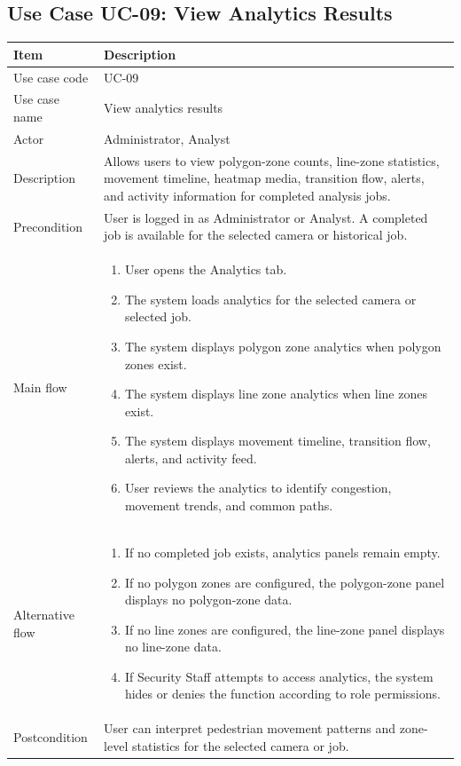 \documentclass[12pt,a4paper]{report}
\begin{document}
\subsection{Use Case UC-09: View Analytics Results}
\begin{longtable}{|p{3.6cm}|p{10.4cm}|}
\hline
\rowcolor{HeaderBlue}\textbf{Item} & \textbf{Description} \\
\hline
Use case code & UC-09 \\
\hline
Use case name & View analytics results \\
\hline
Actor & Administrator, Analyst \\
\hline
Description & Allows users to view polygon-zone counts, line-zone statistics, movement timeline, heatmap media, transition flow, alerts, and activity information for completed analysis jobs. \\
\hline
Precondition & User is logged in as Administrator or Analyst. A completed job is available for the selected camera or historical job. \\
\hline
Main flow &
\begin{enumerate}
    \item User opens the Analytics tab.
    \item The system loads analytics for the selected camera or selected job.
    \item The system displays polygon zone analytics when polygon zones exist.
    \item The system displays line zone analytics when line zones exist.
    \item The system displays movement timeline, transition flow, alerts, and activity feed.
    \item User reviews the analytics to identify congestion, movement trends, and common paths.
\end{enumerate} \\
\hline
Alternative flow &
\begin{enumerate}
    \item If no completed job exists, analytics panels remain empty.
    \item If no polygon zones are configured, the polygon-zone panel displays no polygon-zone data.
    \item If no line zones are configured, the line-zone panel displays no line-zone data.
    \item If Security Staff attempts to access analytics, the system hides or denies the function according to role permissions.
\end{enumerate} \\
\hline
Postcondition & User can interpret pedestrian movement patterns and zone-level statistics for the selected camera or job. \\
\hline
\end{longtable}
\end{document}
